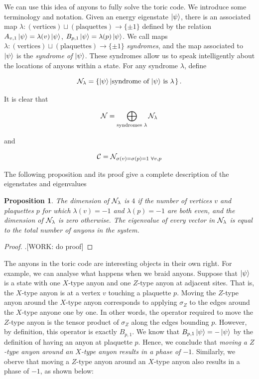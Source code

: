 \documentclass{article}
\newtheorem{proposition}{Proposition}[section]
\theoremstyle{definition}
\numberwithin{figure}{section}
\begin{document}
We can use this idea of anyons to fully solve the toric code. We introduce some terminology and notation. Given an energy eigenstate $\ket{\psi}$, there is an associated map $\lambda: (\text{vertices})\sqcup (\text{plaquettes})\to \{\pm 1\}$ defined by the relation $A_{v,1}\ket{\psi}=\lambda(v)\ket{\psi}$, $B_{p,1}\ket{\psi}=\lambda(p)\ket{\psi}$. We call maps $\lambda: (\text{vertices})\sqcup (\text{plaquettes})\to \{\pm 1\}$ \textit{syndromes}, and the map associated to $\ket{\psi}$ is the \textit{syndrome of $\ket{\psi}$}. These syndromes allow us to speak intelligently about the locations of anyons within a state. For any syndrome $\lambda$, define

$$\mathcal{N}_\lambda=\left\{\ket{\psi}\left| \text{syndrome of $\ket{\psi}$ is $\lambda$}\right.\right\}.$$

It is clear that

$$\mathcal{N}=\bigoplus_{\text{syndromes $\lambda$}}\mathcal{N}_\lambda$$

and

$$\mathcal{C}=\mathcal{N}_{\sigma(v)=\sigma(p)=1 \,\, \forall v,p}$$

The following proposition and its proof give a complete description of the eigenstates and eigenvalues

\begin{proposition}The dimension of $\mathcal{N}_{\lambda}$ is $4$ if the number of vertices $v$ and plaquettes $p$ for which $\lambda(v)=-1$ and $\lambda(p)=-1$ are both even, and the dimension of $\mathcal{N}_{\lambda}$ is zero otherwise. The eigenvalue of every vector in $\mathcal{N}_{\lambda}$ is equal to the total number of anyons in the system.
\end{proposition}
\begin{proof}.[WORK: do proof]
\end{proof}

The anyons in the toric code are interesting objects in their own right. For example, we can analyse what happens when we braid anyons. Suppose that $\ket{\psi}$ is a state with one $X$-type anyon and one $Z$-type anyon at adjacent sites. That is, the $X$-type anyon is at a vertex $v$ touching a plaquette $p$. Moving the $Z$-type anyon around the $X$-type anyon corresponds to applying $\sigma_Z$ to the edges around the $X$-type anyone one by one. In other words, the operator required to move the $Z$-type anyon is the tensor product of $\sigma_Z$ along the edges bounding $p$. However, by definition, this operator is exactly $B_{p,1}$. We know that $B_{p,1}\ket{\psi}=-\ket{\psi}$ by the definition of having an anyon at plaquette $p$. Hence, we conclude that \textit{moving a $Z$-type anyon around an $X$-type anyon results in a phase of $-1$}. Similarly, we oberve that moving a $Z$-type anyon around an $X$-type anyon also results in a phase of $-1$, as shown below:
\end{document}
